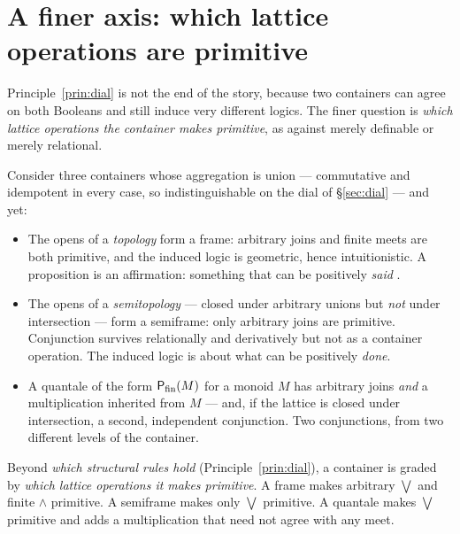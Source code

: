 \section{A finer axis: which lattice operations are primitive}
\label{sec:primitive}

Principle~\ref{prin:dial} is not the end of the story, because two containers can
agree on both Booleans and still induce very different logics. The finer question
is \emph{which lattice operations the container makes primitive}, as against
merely definable or merely relational.

Consider three containers whose aggregation is union --- commutative and
idempotent in every case, so indistinguishable on the dial of
\S\ref{sec:dial} --- and yet:

\begin{itemize}[leftmargin=1.4em]
\item The opens of a \emph{topology} form a frame: arbitrary joins and finite
meets are both primitive, and the induced logic is geometric, hence
intuitionistic. A proposition is an affirmation: something that can be positively
\emph{said} \cite{Vickers89}.
\item The opens of a \emph{semitopology} \cite{Gabbay25} --- closed under
arbitrary unions but \emph{not} under intersection --- form a semiframe: only
arbitrary joins are primitive. Conjunction survives relationally and derivatively
but not as a container operation. The induced logic is about what can be
positively \emph{done}.
\item A quantale of the form $\mathsf{P}_{\mathrm{fin}}(M)$ for a monoid $M$ has arbitrary joins
\emph{and} a multiplication inherited from $M$ --- and, if the lattice is closed
under intersection, a second, independent conjunction. Two conjunctions, from two
different levels of the container.
\end{itemize}

\begin{principle}[Primitivity]
\label{prin:primitive}
Beyond \emph{which structural rules hold} (Principle~\ref{prin:dial}), a container
is graded by \emph{which lattice operations it makes primitive}. A frame makes
arbitrary $\bigvee$ and finite $\wedge$ primitive. A semiframe makes only
$\bigvee$ primitive. A quantale makes $\bigvee$ primitive and adds a multiplication
that need not agree with any meet.
\end{principle}

